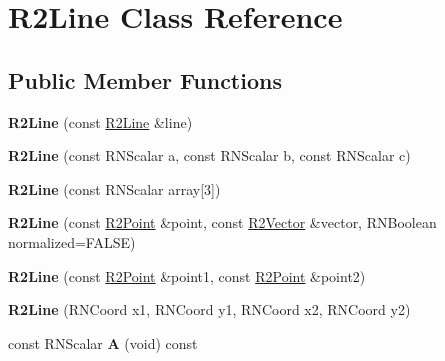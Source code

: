 \hypertarget{class_r2_line}{}\section{R2\+Line Class Reference}
\label{class_r2_line}
\subsection*{Public Member Functions}
\begin{DoxyCompactItemize}
\item 
{\bfseries R2\+Line} (const \hyperlink{class_r2_line}{R2\+Line} \&line)\hypertarget{class_r2_line_a6894f31bc7e24b46cb99fa668ab0fed6}{}\label{class_r2_line_a6894f31bc7e24b46cb99fa668ab0fed6}

\item 
{\bfseries R2\+Line} (const R\+N\+Scalar a, const R\+N\+Scalar b, const R\+N\+Scalar c)\hypertarget{class_r2_line_aef54f25b2fb0b564dcb0533a083ed796}{}\label{class_r2_line_aef54f25b2fb0b564dcb0533a083ed796}

\item 
{\bfseries R2\+Line} (const R\+N\+Scalar array\mbox{[}3\mbox{]})\hypertarget{class_r2_line_a2c2b335f8f9afb34136800cadfe4ba81}{}\label{class_r2_line_a2c2b335f8f9afb34136800cadfe4ba81}

\item 
{\bfseries R2\+Line} (const \hyperlink{class_r2_point}{R2\+Point} \&point, const \hyperlink{class_r2_vector}{R2\+Vector} \&vector, R\+N\+Boolean normalized=F\+A\+L\+SE)\hypertarget{class_r2_line_a24183024dfc525d30061eea904983ec7}{}\label{class_r2_line_a24183024dfc525d30061eea904983ec7}

\item 
{\bfseries R2\+Line} (const \hyperlink{class_r2_point}{R2\+Point} \&point1, const \hyperlink{class_r2_point}{R2\+Point} \&point2)\hypertarget{class_r2_line_a8c67abb4b96bbe2e76aba999266eb154}{}\label{class_r2_line_a8c67abb4b96bbe2e76aba999266eb154}

\item 
{\bfseries R2\+Line} (R\+N\+Coord x1, R\+N\+Coord y1, R\+N\+Coord x2, R\+N\+Coord y2)\hypertarget{class_r2_line_a89799195c2eb703303a8f6f092a91499}{}\label{class_r2_line_a89799195c2eb703303a8f6f092a91499}

\item 
const R\+N\+Scalar {\bfseries A} (void) const \hypertarget{class_r2_line_af28f87b51baf346a3456cdd766504787}{}\label{class_r2_line_af28f87b51baf346a3456cdd766504787}


\end{DoxyCompactItemize}
